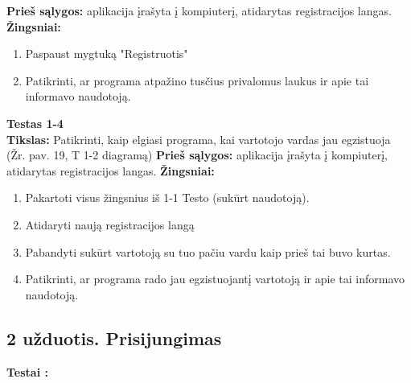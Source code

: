 \documentclass{VUMIFPSkursinis}
\begin{document}
\textbf{Prieš sąlygos:} aplikacija įrašyta į kompiuterį, atidarytas registracijos langas.
\hfill \break
\hfill \break
\textbf{Žingsniai:}
\hfill \break
\begin{enumerate}
\item Paspaust mygtuką "Registruotis"
\item Patikrinti, ar programa atpažino tusčius privalomus laukus ir apie tai informavo naudotoją.
\end{enumerate}
\textbf{Testas 1-4}\\
\hfill \break
\textbf{Tikslas:} Patikrinti, kaip elgiasi programa, kai vartotojo vardas jau egzistuoja (Žr. pav. 19, T 1-2 diagramą)
\hfill \break
\hfill \break
\textbf{Prieš sąlygos:} aplikacija įrašyta į kompiuterį, atidarytas registracijos langas.
\hfill \break
\hfill \break
\textbf{Žingsniai:}
\hfill \break
\begin{enumerate}
\item Pakartoti visus žingsnius iš 1-1 Testo (sukūrt naudotoją).
\item Atidaryti naują registracijos langą
\item Pabandyti sukūrt vartotoją su tuo pačiu vardu kaip prieš tai buvo kurtas.
\item Patikrinti, ar programa rado jau egzistuojantį vartotoją ir apie tai informavo naudotoją.
\end{enumerate}

\subsection*{2 užduotis. Prisijungimas}
\textbf{Testai :}
\end{document}
